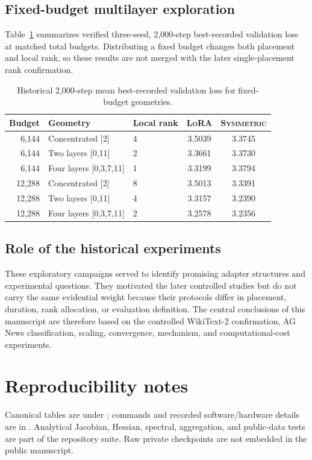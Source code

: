 \documentclass[11pt]{article}
\newcommand{\sym}{\textsc{Symmetric}}\newcommand{\lora}{\textsc{LoRA}}
\begin{document}
\subsection{Fixed-budget multilayer exploration}
Table~\ref{tab:hist-budget} summarizes verified three-seed, 2,000-step best-recorded validation loss at matched total budgets. Distributing a fixed budget changes both placement and local rank, so these results are not merged with the later single-placement rank confirmation.
\begin{table}[htbp]\centering\small
\caption{Historical 2,000-step mean best-recorded validation loss for fixed-budget geometries.}\label{tab:hist-budget}
\begin{tabular}{rllcc}\toprule
Budget&Geometry&Local rank&\lora{}&\sym{}\\\midrule
6,144&Concentrated [2]&4&3.5039&3.3745\\
6,144&Two layers [0,11]&2&3.3661&3.3730\\
6,144&Four layers [0,3,7,11]&1&3.3199&3.3794\\
12,288&Concentrated [2]&8&3.5013&3.3391\\
12,288&Two layers [0,11]&4&3.3157&3.2390\\
12,288&Four layers [0,3,7,11]&2&3.2578&3.2356\\\bottomrule
\end{tabular}\end{table}

\subsection{Role of the historical experiments}
These exploratory campaigns served to identify promising adapter structures and experimental questions. They motivated the later controlled studies but do not carry the same evidential weight because their protocols differ in placement, duration, rank allocation, or evaluation definition. The central conclusions of this manuscript are therefore based on the controlled WikiText-2 confirmation, AG News classification, scaling, convergence, mechanism, and computational-cost experiments.

\section{Reproducibility notes}
Canonical tables are under ; commands and recorded software/hardware details are in . Analytical Jacobian, Hessian, spectral, aggregation, and public-data tests are part of the repository suite. Raw private checkpoints are not embedded in the public manuscript.
\end{document}

